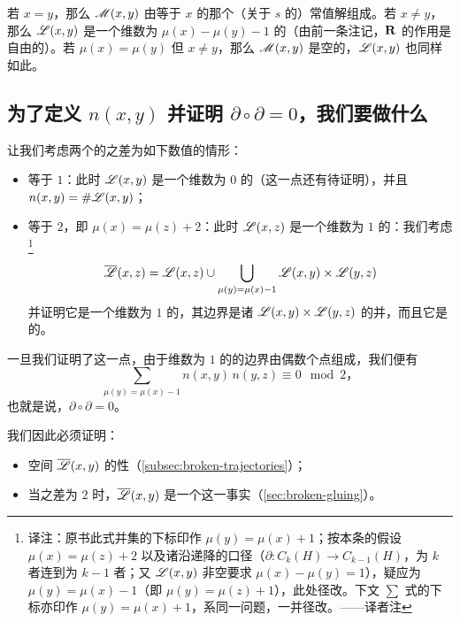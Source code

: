 \begin{remark}\label{thm:l-dimension-remark}
若 $x=y$，那么 $\mathscr{M}(x,y)$ 由等于 $x$ 的那个（关于 $s$ 的）常值解组成。若 $x\neq y$，那么 $\mathscr{L}(x,y)$ 是一个维数为 $\mu(x)-\mu(y)-1$ 的\trManifold（由前一条注记，$\mathbf{R}$ 的作用是自由的）。若 $\mu(x)=\mu(y)$ 但 $x\neq y$，那么 $\mathscr{M}(x,y)$ 是空的，$\mathscr{L}(x,y)$ 也同样如此。
\end{remark}

\subsection{为了定义 $n(x,y)$ 并证明 $\partial\circ\partial=0$，我们要做什么}
\label{subsec:what-we-need-to-do}

让我们考虑两个\trCriticalPoint{}的\trIndex{}之差为如下数值的情形：
\begin{itemize}
\item 等于 $1$：此时 $\mathscr{L}(x,y)$ 是一个维数为 $0$ 的\trCompact\trManifold（这一点还有待证明），并且 $n(x,y)=\#\mathscr{L}(x,y)$；
\item 等于 $2$，即 $\mu(x)=\mu(z)+2$：此时 $\mathscr{L}(x,z)$ 是一个维数为 $1$ 的\trManifold：我们考虑\footnote{译注：原书此式并集的下标印作 $\mu(y)=\mu(x)+1$；按本条的假设 $\mu(x)=\mu(z)+2$ 以及诸\trTrajectory{}沿\trIndex{}递降的口径（$\partial\colon C_{k}(H)\to C_{k-1}(H)$，\trIndex{}为 $k$ 者连到\trIndex{}为 $k-1$ 者；又 $\mathscr{L}(x,y)$ 非空要求 $\mu(x)-\mu(y)=1$），疑应为 $\mu(y)=\mu(x)-1$（即 $\mu(y)=\mu(z)+1$），此处径改。下文 $\sum$ 式的下标亦印作 $\mu(y)=\mu(x)+1$，系同一问题，一并径改。——译者注}
\[
\overline{\mathscr{L}}(x,z)=\mathscr{L}(x,z)\cup\bigcup_{\mu(y)=\mu(x)-1}\mathscr{L}(x,y)\times\mathscr{L}(y,z)
\]
并证明它是一个维数为 $1$ 的\trManifold，其边界是诸 $\mathscr{L}(x,y)\times\mathscr{L}(y,z)$ 的并，而且它是\trCompact{}的。
\end{itemize}

一旦我们证明了这一点，由于维数为 $1$ 的\trManifold{}的边界由偶数个点组成，我们便有
\[
\sum_{\mu(y)=\mu(x)-1}n(x,y)\,n(y,z)\equiv 0\mod 2\text{，}
\]
也就是说，$\partial\circ\partial=0$。

我们因此必须证明：
\begin{itemize}
\item 空间 $\overline{\mathscr{L}}(x,y)$ 的\trCompact{}性（\cref{subsec:broken-trajectories}）；
\item 当\trIndex{}之差为 $2$ 时，$\overline{\mathscr{L}}(x,y)$ 是一个\trManifoldWithBoundary{}这一事实（\cref{sec:broken-gluing}）。
\end{itemize}

